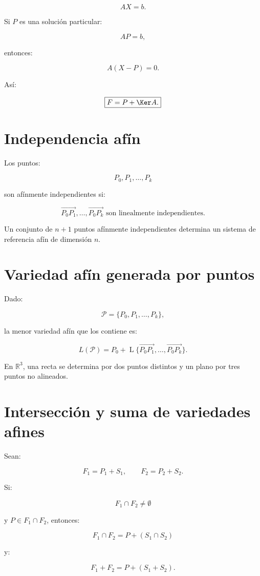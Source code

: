 \documentclass[11pt,a4paper]{article}
\newcommand{\R}{\mathbb{R}}
\newcommand{\Span}{\operatorname{L}}
\begin{document}
\[
AX=b.
\]

Si $P$ es una solución particular:

\[
AP=b,
\]

entonces:

\[
A(X-P)=0.
\]

Así:

\[
\boxed{
F=P+\Ker A.
}
\]

\section{Independencia afín}

Los puntos:

\[
P_0,P_1,\ldots,P_k
\]

son afínmente independientes si:

\[
\boxed{
\overrightarrow{P_0P_1},
\ldots,
\overrightarrow{P_0P_k}
\text{ son linealmente independientes}.
}
\]

Un conjunto de $n+1$ puntos afínmente independientes determina un sistema de referencia afín de dimensión $n$.

\section{Variedad afín generada por puntos}

Dado:

\[
\mathcal P=\{P_0,P_1,\ldots,P_k\},
\]

la menor variedad afín que los contiene es:

\[
\boxed{
L(\mathcal P)
=
P_0+
\Span\{
\overrightarrow{P_0P_1},
\ldots,
\overrightarrow{P_0P_k}
\}.
}
\]

En $\R^3$, una recta se determina por dos puntos distintos y un plano por tres puntos no alineados.

\section{Intersección y suma de variedades afines}

Sean:

\[
F_1=P_1+S_1,
\qquad
F_2=P_2+S_2.
\]

Si:

\[
F_1\cap F_2\neq\emptyset
\]

y $P\in F_1\cap F_2$, entonces:

\[
\boxed{
F_1\cap F_2=P+(S_1\cap S_2)
}
\]

y:

\[
\boxed{
F_1+F_2=P+(S_1+S_2).
}
\]
\end{document}
